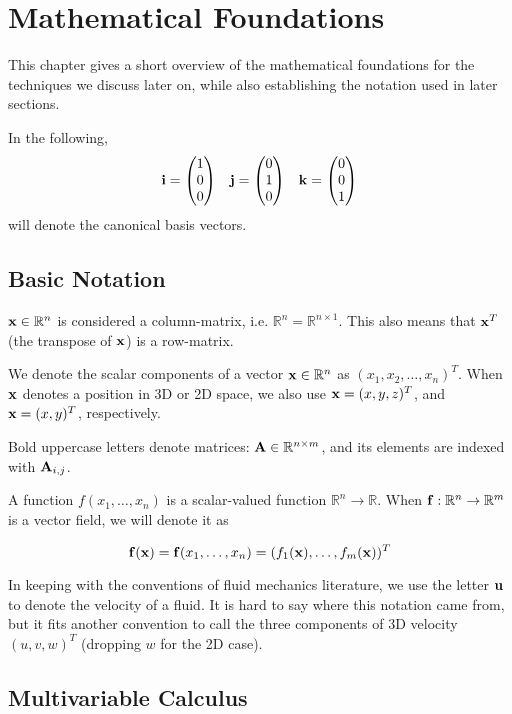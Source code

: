 \chapter{Mathematical Foundations}
\label{sec:mathematicalFoundations}
This chapter gives a short overview of the mathematical foundations for the
techniques we discuss later on, while also establishing the notation used in
later sections.

In the following,
\begin{equation*}
    \vb{i} = \mqty( 1 \\ 0 \\ 0 )\quad
    \vb{j} = \mqty( 0 \\ 1 \\ 0 )\quad
    \vb{k} = \mqty( 0 \\ 0 \\ 1 )
\end{equation*}
will denote the canonical basis vectors.

\section{Basic Notation}

$\vb{x} \in \mathbb{R}^n$ is considered a column-matrix, i.e. $\mathbb{R}^n
= \mathbb{R}^{n \times 1}$. This also means that $\vb{x}^T$ (the transpose of
$\vb{x}$) is a row-matrix.

We denote the scalar components of a vector $\vb{x}\in \mathbb{R}^{n}$ as $(x_1,
x_2, \dots, x_n)^T$. When $\vb{x}$ denotes a position in 3D or 2D space, we also
use $\vb{x} = (x,y,z)^T$, and $\vb{x} = (x,y)^T$, respectively.

Bold uppercase letters denote matrices: $\vb{A}\in \mathbb{R}^{n \times m}$, and
its elements are indexed with $\vb{A}_{i,j}$.

A function $f(x_1, \dots, x_n)$ is a scalar-valued function $\mathbb{R}^n \to
\mathbb{R}$.  When $\vb{f}: \mathbb{R}^n \to \mathbb{R}^m$ is a vector field, we
will denote it as 

$$\vb{f}(\vb{x}) = \vb{f}(x_1,\dots, x_n) =
(f_1(\vb{x}), \dots, f_m(\vb{x}))^T$$

In keeping with the conventions of fluid mechanics literature, we use the letter
$\vb{u}$ to denote the velocity of a fluid. It is hard to say where this
notation came from, but it fits another convention to call the three components
of 3D velocity $(u, v, w)^T$ (dropping $w$ for the 2D case).

\section{Multivariable Calculus}
